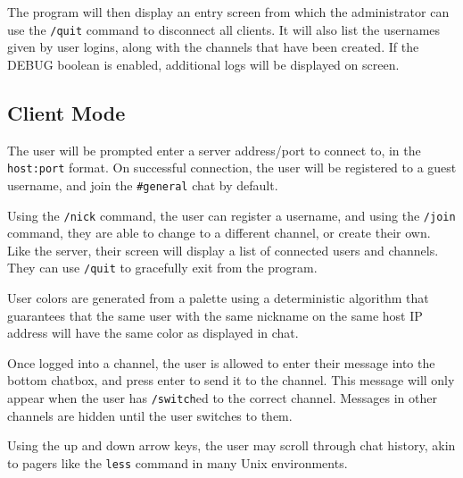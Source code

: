 \documentclass{article}
\begin{document}
The program will then display an entry screen from which the administrator can use the \verb|/quit| command to disconnect all clients. It will also list the usernames given by user logins, along with the channels that have been created. If the DEBUG boolean is enabled, additional logs will be displayed on screen.

\subsection{Client Mode}
The user will be prompted enter a server address/port to connect to, in the \verb|host:port| format. On successful connection, the user will be registered to a guest username, and join the \verb|#general| chat by default.

Using the \verb|/nick| command, the user can register a username, and using the \verb|/join| command, they are able to change to a different channel, or create their own. Like the server, their screen will display a list of connected users and channels. They can use \verb|/quit| to gracefully exit from the program.

User colors are generated from a palette using a deterministic algorithm that guarantees that the same user with the same nickname on the same host IP address will have the same color as displayed in chat.

Once logged into a channel, the user is allowed to enter their message into the bottom chatbox, and press enter to send it to the channel. This message will only appear when the user has \verb|/switch|ed to the correct channel. Messages in other channels are hidden until the user switches to them.

Using the up and down arrow keys, the user may scroll through chat history, akin to pagers like the \verb|less| command in many Unix environments.
\end{document}
